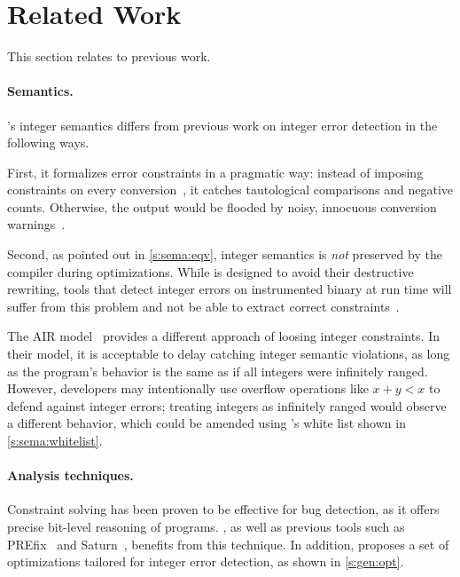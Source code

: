\section{Related Work}
\label{s:relwk}

This section relates \sys to previous work.

\paragraph{Semantics.}
\sys's integer semantics differs from previous work on integer error
detection in the following ways.

First, it formalizes error constraints in a pragmatic way: instead
of imposing constraints on every conversion~\cite{brumley:rich,
moy:prefix, seacord:secure-c}, it catches tautological comparisons
and negative counts.  Otherwise, the output would be flooded by
noisy, innocuous conversion warnings~\cite{moy:prefix}.

Second, as pointed out in \autoref{s:sema:eqv}, integer semantics
is \emph{not} preserved by the compiler during optimizations.  While
\sys is designed to avoid their destructive rewriting, tools that
detect integer errors on instrumented binary at run time will suffer
from this problem and not be able to extract correct
constraints~\cite{molnar:catchconv, intscope}.

The AIR model~\cite{air} provides a different approach of loosing
integer constraints.  In their model, it is acceptable to delay
catching integer semantic violations, as long as the program's
behavior is the same as if all integers were infinitely ranged.
However, developers may intentionally use overflow operations like
$x + y < x$ to defend against integer errors; treating integers as
infinitely ranged would observe a different behavior, which could
be amended using \sys's white list shown in \autoref{s:sema:whitelist}.

\paragraph{Analysis techniques.}

Constraint solving has been proven to be effective for bug detection,
as it offers precise bit-level reasoning of programs.  \sys, as
well as previous tools such as PREfix~\cite{moy:prefix} and
Saturn~\cite{xie:saturn}, benefits from this technique.  In addition,
\sys proposes a set of optimizations tailored for integer error
detection, as shown in \autoref{s:gen:opt}.

